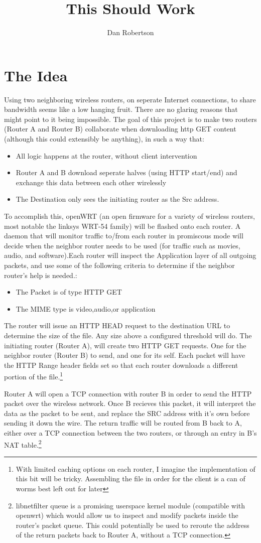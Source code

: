 \documentclass{article}
\author{Dan Robertson}
\title{This Should Work}
\begin{document}
\section{The Idea}
Using two neighboring wireless routers, on seperate Internet connections, to share bandwidth seems like a low hanging fruit. There are no glaring reasons that might point to it being impossible. The goal of this project is to make two routers (Router A and Router B) collaborate when downloading http GET content (although this could extensibly be anything), in such a way that:
\begin{itemize}
\item All logic happens at the router, without client intervention
\item Router A and B download seperate halves (using HTTP start/end) and exchange this data between each other wirelessly
\item The Destination only sees the initiating router as the Src address.
\end{itemize}

To accomplish this, openWRT (an open firmware for a variety of wireless routers, most notable the linksys WRT-54 family) will be flashed onto each router. A daemon that will monitor traffic to/from each router in promiscous mode will decide when the neighbor router needs to be used (for traffic such as movies, audio, and software).Each router will inspect the Application layer of all outgoing packets, and use some of the following criteria to determine if the neighbor router's help is needed.:
\begin{itemize}
\item The Packet is of type HTTP GET
\item The MIME type is video,audio,or application
\end{itemize}
The router will issue an HTTP HEAD request to the destination URL to determine the size of the file. Any size above a configured threshold will do. The initiating router (Router A), will create two HTTP GET requests. One for the neighbor router (Router B) to send, and one for its self. Each packet will have the HTTP Range header fields set so that each router downloads a different portion of the file.\footnote[1]{With limited caching options on each router, I imagine the implementation of this bit will be tricky. Assembling the file in order for the client is a can of worms best left out for later}

Router A will open a TCP connection with router B in order to send the HTTP packet over the wireless network. Once B recieves this packet, it will interpret the data as the packet to be sent, and replace the SRC address with it's own before sending it down the wire. The return traffic will be routed from B back to A, either over a TCP connection between the two routers, or through an entry in B's NAT table.\footnote[2]{libnetfilter queue is a promising userspace kernel module (compatible with openwrt) which would allow us to inspect and modify packets inside the router's packet queue. This could potentially be used to reroute the address of the return packets back to Router A, without a TCP connection.}
\end{document}
